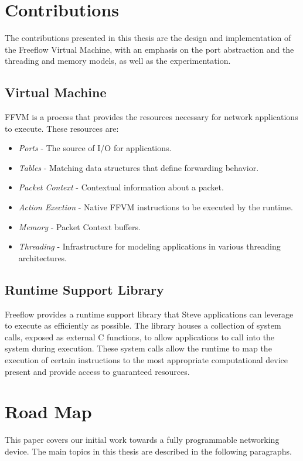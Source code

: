 \section{Contributions}
The contributions presented in this thesis are the design and implementation of
the Freeflow Virtual Machine, with an emphasis on the port abstraction and the
threading and memory models, as well as the experimentation.

\subsection{Virtual Machine}
FFVM is a process that provides the resources necessary for network
applications to execute. These resources are:

\begin{itemize}
\item \emph{Ports} - The source of I/O for applications.
\item \emph{Tables} - Matching data structures that define forwarding behavior.
\item \emph{Packet Context} - Contextual information about a packet.
\item \emph{Action Exection} - Native FFVM instructions to be executed by the
runtime.
\item \emph{Memory} - Packet Context buffers.
\item \emph{Threading} - Infrastructure for modeling applications in various
threading architectures.
\end{itemize}

\subsection{Runtime Support Library}
Freeflow provides a runtime support library that Steve applications can
leverage to execute as efficiently as possible. The library houses a collection
of system calls, exposed as external C functions, to allow applications to call
into the system during execution. These system calls allow the runtime to map
the execution of certain instructions to the most appropriate computational
device present and provide access to guaranteed resources.

\section{Road Map}
This paper covers our initial work towards a fully programmable networking
device. The main topics in this thesis are described in the following paragraphs.


